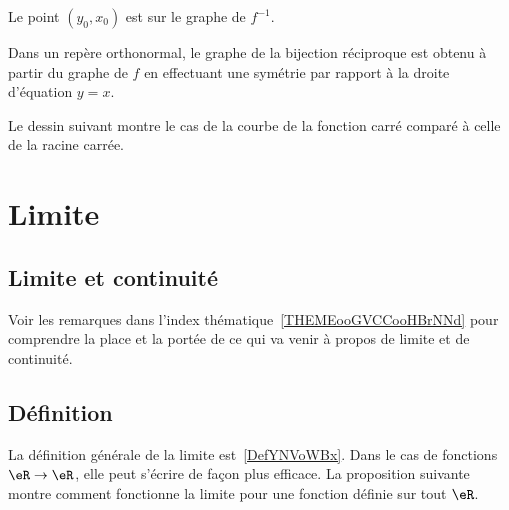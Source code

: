         Le point \( (y_0,x_0)\) est sur le graphe de \( f^{-1}\).

\begin{Aretenir}
    Dans un repère orthonormal, le graphe de la bijection réciproque est obtenu à partir du graphe de \( f\) en effectuant une symétrie par rapport à la droite d'équation \( y=x\).
\end{Aretenir}

Le dessin suivant montre le cas de la courbe de la fonction carré comparé à celle de la racine carrée.
\begin{center}
   
\end{center}

\section{Limite}

\subsection{Limite et continuité}

Voir les remarques dans l'index thématique~\ref{THEMEooGVCCooHBrNNd} pour comprendre la place et la portée de ce qui va venir à propos de limite et de continuité.

\subsection{Définition}

La définition générale de la limite est~\ref{DefYNVoWBx}. Dans le cas de fonctions \( \eR\to \eR\), elle peut s'écrire de façon plus efficace. La proposition suivante montre comment fonctionne la limite pour une fonction définie sur tout \( \eR\).

